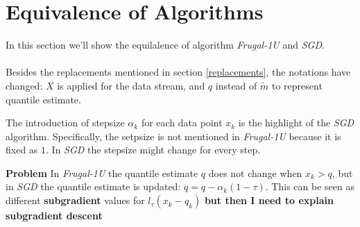 \documentclass[11pt]{article}
\begin{document}
\section{Equivalence of Algorithms}
In this section we'll show the equilalence of algorithm \textit{Frugal-1U} 
and \textit{SGD}.
\\\\
Besides the replacements mentioned in section \ref{replacements},
the notations have changed: 
$X$ is applied for the data stream, and $q$ instead of $\tilde{m}$
to represent quantile estimate.

The introduction of stepsize $\alpha_k$ for each data point $x_k$
is the highlight of the \textit{SGD} algorithm.
Specifically, the setpsize is not mentioned in \textit{Frugal-1U} 
because it is fixed as $1$. In \textit{SGD} the stepsize might change for every step.

{\color{red} \textbf{Problem}}
In \textit{Frugal-1U} the quantile estimate $q$ does not change when $x_k > q$, but in \textit{SGD} 
the quantile estimate is updated: $q = q-\alpha_k (1-\tau)$. This can be seen as different 
\textbf{subgradient} values for $l_\tau(x_k - q_k)$ 
{\color{red} \textbf{but then I need to explain subgradient descent}} 
\end{document}
